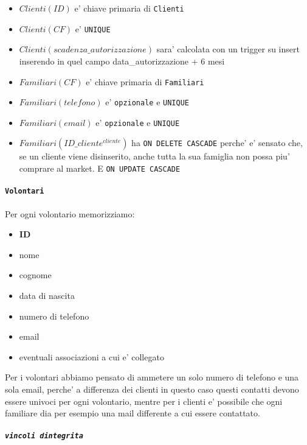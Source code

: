 \documentclass[]{article}
\providecommand{\tightlist}{%
  \setlength{\itemsep}{0pt}\setlength{\parskip}{0pt}}
\let\oldparagraph\paragraph
\renewcommand{\paragraph}[1]{\oldparagraph{#1}\mbox{}}
\let\oldsubparagraph\subparagraph
\renewcommand{\subparagraph}[1]{\oldsubparagraph{#1}\mbox{}}
\begin{document}
\begin{itemize}
\tightlist
\item
  \(Clienti(ID)\) e' chiave primaria di \texttt{Clienti}
\item
  \(Clienti(CF)\) e' \texttt{UNIQUE}
\item
  \(Clienti(scadenza\_autorizzazione)\) sara' calcolata con un trigger
  su insert inserendo in quel campo data\_autorizzazione + 6 mesi
\item
  \(Familiari(CF)\) e' chiave primaria di \texttt{Familiari}
\item
  \(Familiari(telefono)\) e' \texttt{opzionale} e \texttt{UNIQUE}
\item
  \(Familiari(email)\) e' \texttt{opzionale} e \texttt{UNIQUE}
\item
  \(Familiari(ID\_cliente^{cliente})\) ha \texttt{ON\ DELETE\ CASCADE}
  perche' e' sensato che, se un cliente viene disinserito, anche tutta
  la sua famiglia non possa piu' comprare al market. E
  \texttt{ON\ UPDATE\ CASCADE}
\end{itemize}

\hypertarget{volontari}{%
\paragraph{\texorpdfstring{\texttt{Volontari}}{Volontari}}\label{volontari}}

Per ogni volontario memorizziamo:

\begin{itemize}
\tightlist
\item
  \textbf{ID}
\item
  nome
\item
  cognome
\item
  data di nascita
\item
  numero di telefono
\item
  email
\item
  eventuali associazioni a cui e' collegato
\end{itemize}

Per i volontari abbiamo pensato di ammetere un solo numero di telefono e
una sola email, perche' a differenza dei clienti in questo caso questi
contatti devono essere univoci per ogni volontario, mentre per i clienti
e' possibile che ogni familiare dia per esempio una mail differente a
cui essere contattato.

\hypertarget{vincoli-dintegrita-1}{%
\subparagraph{\texorpdfstring{\texttt{vincoli\ d\textquotesingle{}integrita\textquotesingle{}}}{vincoli d'integrita'}}\label{vincoli-dintegrita-1}}
\end{document}
